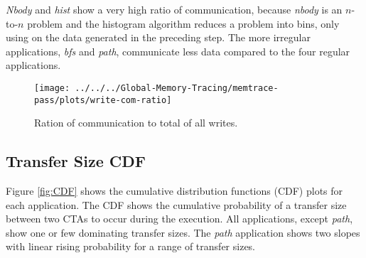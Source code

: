\textit{Nbody} and \textit{hist} show a very high ratio of communication, because \textit{nbody} is an $n$-to-$n$ problem and the histogram algorithm reduces a problem into bins, only using on the data generated in the preceding step. The more irregular applications, \textit{bfs} and \textit{path}, communicate less data compared to the four regular applications.
\begin{figure}[t]
	\centering
	\texttt{[image: ../../../Global-Memory-Tracing/memtrace-pass/plots/write-com-ratio]}
	\caption{Ration of communication to total of all writes.}
	\label{com-ratio}
\end{figure}
\subsection{Transfer Size CDF}
Figure \ref{fig:CDF} shows the cumulative distribution functions (CDF) plots for each application. The CDF shows the cumulative probability of a transfer size between two CTAs to occur during the execution. All applications, except \textit{path}, show one or few dominating transfer sizes. The \textit{path} application shows two slopes with linear rising probability for a range of transfer sizes.

